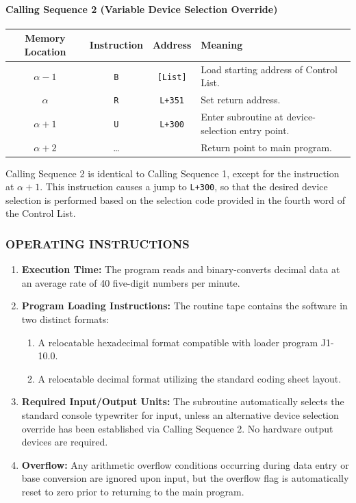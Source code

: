 \paragraph{Calling Sequence 2 (Variable Device Selection Override)}
\begin{table}[h!]
\centering
\begin{tabularx}{\textwidth}{cccX}
\toprule
\textbf{Memory Location} & \textbf{Instruction} & \textbf{Address} & \textbf{Meaning} \\
\midrule
$\alpha-1$   & \texttt{B} & \texttt{[List]} & Load starting address of Control List. \\
$\alpha$     & \texttt{R} & \texttt{L+351}  & Set return address. \\
$\alpha+1$   & \texttt{U} & \texttt{L+300}  & Enter subroutine at device-selection entry point. \\
$\alpha+2$   & \dots      &                  & Return point to main program. \\
\bottomrule
\end{tabularx}
\end{table}
Calling Sequence 2 is identical to Calling Sequence 1, except for the instruction at $\alpha+1$. This instruction causes a jump to \texttt{L+300}, so that the desired device selection is performed based on the selection code provided in the fourth word of the Control List.

\subsubsection*{OPERATING INSTRUCTIONS}
\begin{enumerate}
    \item \textbf{Execution Time:} The program reads and binary-converts decimal data at an average rate of 40 five-digit numbers per minute.
    \item \textbf{Program Loading Instructions:} The routine tape contains the software in two distinct formats:
    \begin{enumerate}[label=\alph*)]
        \item A relocatable hexadecimal format compatible with loader program J1-10.0.
        \item A relocatable decimal format utilizing the standard coding sheet layout.
    \end{enumerate}
    \item \textbf{Required Input/Output Units:} The subroutine automatically selects the standard console typewriter for input, unless an alternative device selection override has been established via Calling Sequence 2. No hardware output devices are required.
    \item \textbf{Overflow:} Any arithmetic overflow conditions occurring during data entry or base conversion are ignored upon input, but the overflow flag is automatically reset to zero prior to returning to the main program.
\end{enumerate}

